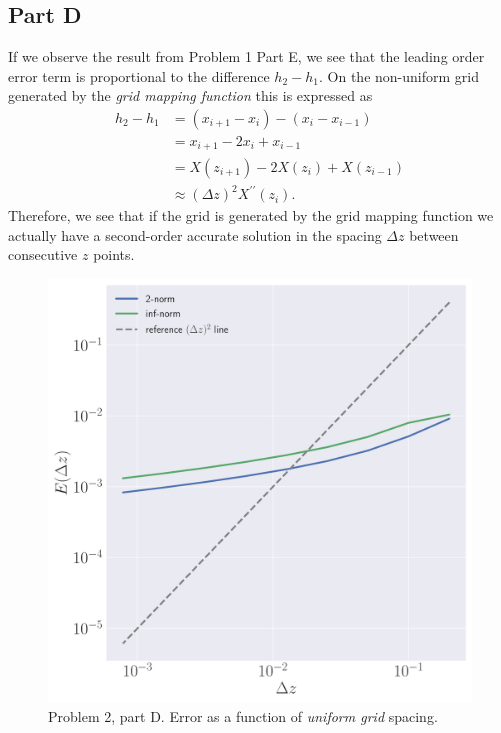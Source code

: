\documentclass[12pt]{article}
\begin{document}
\subsection*{Part D}
If we observe the result from Problem 1 Part E, we see that the leading order error term is proportional to the difference $h_{2}-h_{1}$. On
the non-uniform grid generated by the \emph{grid mapping function} this is expressed as
\begin{subequations}
    \begin{align}
        h_{2} - h_{1} &= (x_{i+1}-x_{i})-(x_{i}-x_{i-1})\\
        &= x_{i+1}-2x_{i}+x_{i-1}\\
        &= X(z_{i+1}) - 2X(z_{i}) + X(z_{i-1})\\
        &\approx (\Delta z)^{2}X^{\prime\prime}(z_{i}).
    \end{align}
\end{subequations}
Therefore, we see that if the grid is generated by the grid mapping function we actually have a second-order accurate solution in the
spacing $\Delta z$ between consecutive $z$ points.

\begin{figure}[!h]
	\centering
	\includegraphics[clip, scale=0.40]{q2d_fig.pdf}
	\caption{Problem 2, part D. Error as a function of \emph{uniform grid} spacing. }
\end{figure}
\end{document}
